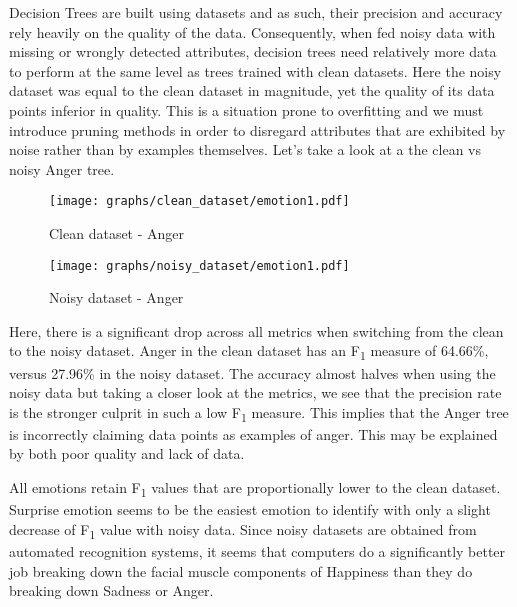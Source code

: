 Decision Trees are built using datasets and as such, their precision and accuracy rely heavily on the quality of the data.
Consequently, when fed noisy data with missing or wrongly detected attributes, decision trees need relatively more data to
perform at the same level as trees trained with clean datasets. Here the noisy dataset was equal to the clean dataset in magnitude, yet the quality of its data points
inferior in quality. This is a situation prone to overfitting and we must introduce pruning methods in order to disregard attributes
that are exhibited by noise rather than by examples themselves. Let's take a look at a the clean vs noisy Anger tree.

\begin{figure}[!ht]
\center
	\caption{Clean dataset - Anger}  
	\texttt{[image: graphs/clean\_dataset/emotion1.pdf]}
   \label{fig:cleandecisionTree1}
\end{figure}

\begin{figure}[!ht]
\center
	\caption{Noisy dataset - Anger}  
	\texttt{[image: graphs/noisy\_dataset/emotion1.pdf]}
   \label{fig:cleandecisionTree1}
\end{figure}



Here, there is a significant drop across all metrics when switching from the clean to the noisy dataset.
Anger in the clean dataset has an F\textsubscript{1} measure of 64.66\%, versus 27.96\% in the noisy dataset.
The accuracy almost halves when using the noisy data but taking a closer look at the metrics, we see that the precision
rate is the stronger culprit in such a low F\textsubscript{1} measure. This implies that the Anger tree is incorrectly claiming
data points as examples of anger. This may be explained by both poor quality and lack of data.

All emotions retain F\textsubscript{1} values that are proportionally lower to the clean dataset. 
Surprise emotion seems to be the easiest emotion to identify with only a slight decrease of F\textsubscript{1} value with noisy data.
Since noisy datasets are obtained from automated recognition systems, it seems that computers do a significantly better job
breaking down the facial muscle components of Happiness than they do breaking down Sadness or Anger. 
